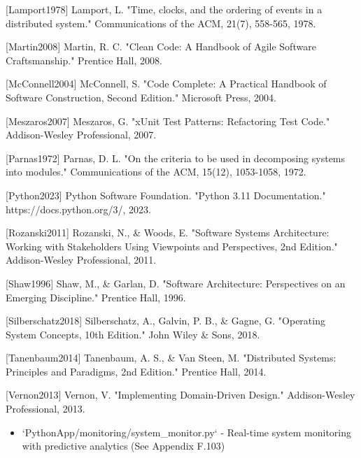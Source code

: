 \documentclass[12pt,a4paper]{article}
\begin{document}
[Lamport1978] Lamport, L. "Time, clocks, and the ordering of events in a distributed system." Communications of the ACM,
21(7), 558-565, 1978.

[Martin2008] Martin, R. C. "Clean Code: A Handbook of Agile Software Craftsmanship." Prentice Hall, 2008.

[McConnell2004] McConnell, S. "Code Complete: A Practical Handbook of Software Construction, Second Edition." Microsoft
Press, 2004.

[Meszaros2007] Meszaros, G. "xUnit Test Patterns: Refactoring Test Code." Addison-Wesley Professional, 2007.

[Parnas1972] Parnas, D. L. "On the criteria to be used in decomposing systems into modules." Communications of the ACM,
15(12), 1053-1058, 1972.

[Python2023] Python Software Foundation. "Python 3.11 Documentation." https://docs.python.org/3/, 2023.

[Rozanski2011] Rozanski, N., \& Woods, E. "Software Systems Architecture: Working with Stakeholders Using Viewpoints and
Perspectives, 2nd Edition." Addison-Wesley Professional, 2011.

[Shaw1996] Shaw, M., \& Garlan, D. "Software Architecture: Perspectives on an Emerging Discipline." Prentice Hall, 1996.

[Silberschatz2018] Silberschatz, A., Galvin, P. B., \& Gagne, G. "Operating System Concepts, 10th Edition." John Wiley \&
Sons, 2018.

[Tanenbaum2014] Tanenbaum, A. S., \& Van Steen, M. "Distributed Systems: Principles and Paradigms, 2nd Edition." Prentice
Hall, 2014.

[Vernon2013] Vernon, V. "Implementing Domain-Driven Design." Addison-Wesley Professional, 2013.

\begin{itemize}
\item `PythonApp/monitoring/system_monitor.py` - Real-time system monitoring with predictive analytics (See Appendix
  F.103)
\end{itemize}
\end{document}
